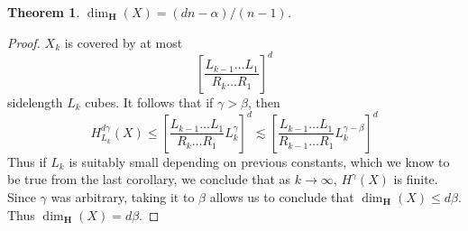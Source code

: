 \documentclass{article}
\theoremstyle{plain}
\theoremstyle{plain}
\newtheorem{theorem}{Theorem}
\begin{document}
\begin{theorem}
	$\dim_{\mathbf{H}}(X) = (dn - \alpha)/(n-1)$.
\end{theorem}
\begin{proof}
	$X_k$ is covered by at most
	\[ \left[ \frac{L_{k-1} \dots L_1}{R_k \dots R_1} \right]^d \]
	sidelength $L_k$ cubes. It follows that if $\gamma > \beta$, then
	\[ H^{d\gamma}_{L_k}(X) \leq \left[ \frac{L_{k-1} \dots L_1}{R_k \dots R_1} L_k^\gamma \right]^d \lesssim \left[ \frac{L_{k-1} \dots L_1}{R_{k-1} \dots R_1} L_k^{\gamma - \beta} \right]^d \]
	Thus if $L_k$ is suitably small depending on previous constants, which we know to be true from the last corollary, we conclude that as $k \to \infty$, $H^\gamma(X)$ is finite. Since $\gamma$ was arbitrary, taking it to $\beta$ allows us to conclude that $\dim_{\mathbf{H}}(X) \leq d \beta$. Thus $\dim_{\mathbf{H}}(X) = d \beta$.
\end{proof}


\end{document}
